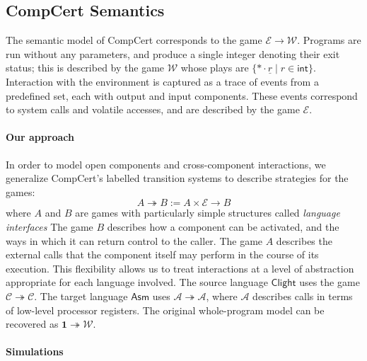 \documentclass[sigplan,10pt,review,anonymous]{acmart}
\newcommand{\kw}[1]{\ensuremath{ \mathsf{#1} }}
\begin{document}
\subsection{CompCert Semantics} %

The semantic model of CompCert corresponds to
the game $\mathcal{E} \rightarrow \mathcal{W}$.
Programs are run without any parameters,
and produce a single integer denoting their exit status;
this is described by the game $\mathcal{W}$
whose plays are $\{ * \cdot \underline{r} \mid r \in \kw{int} \}$.
Interaction with the environment
is captured as a trace of events from a predefined set,
each with output and input components.
These events correspond to system calls and volatile accesses,
and are described by the game $\mathcal{E}$.

\paragraph{Our approach} %

In order to model open components and cross-component interactions,
we generalize CompCert's labelled transition systems
to describe strategies for the games:
\[ A \twoheadrightarrow B :=
   A \times \mathcal{E} \rightarrow B \]
where $A$ and $B$ are games with particularly simple structures
called \emph{language interfaces}
The game $B$ describes how a component can be activated,
and the ways in which it can return control to the caller.
The game $A$ describes the external calls that the component itself
may perform in the course of its execution.
This flexibility allows us to treat interactions
at a level of abstraction appropriate for each language involved.
The source language \kw{Clight} uses the game
$\mathcal{C} \twoheadrightarrow \mathcal{C}$.
The target language \kw{Asm} uses
$\mathcal{A} \twoheadrightarrow \mathcal{A}$,
where $\mathcal{A}$ describes calls
in terms of low-level processor registers.
The original whole-program model can be recovered as
$\mathbf{1} \twoheadrightarrow \mathcal{W}$.



\paragraph{Simulations} %
\end{document}
